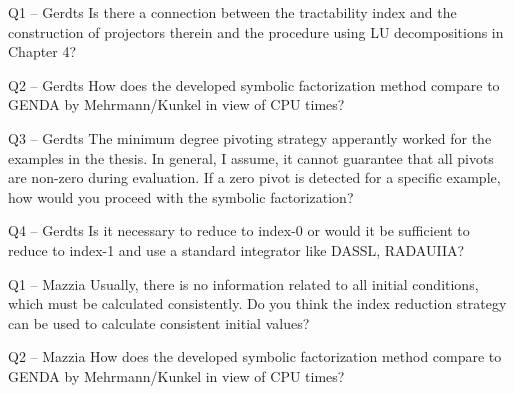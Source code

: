 
\begin{frame}{Q1 -- Gerdts}
  Is there a connection between the tractability index and the construction of projectors therein and the procedure using LU decompositions in Chapter 4?
\end{frame}

\begin{frame}{Q2 -- Gerdts}
  How does the developed symbolic factorization method compare to GENDA by Mehrmann/Kunkel in view of CPU times?
\end{frame}

\begin{frame}{Q3 -- Gerdts}
  The minimum degree pivoting strategy apperantly worked for the examples in the thesis. In general, I assume, it cannot guarantee that all pivots are non-zero during evaluation. If a zero pivot is detected for a specific example, how would you proceed with the symbolic factorization?
\end{frame}

\begin{frame}{Q4 -- Gerdts}
  Is it necessary to reduce to index-0 or would it be sufficient to reduce to index-1 and use a standard integrator like DASSL, RADAUIIA?
\end{frame}

\begin{frame}{Q1 -- Mazzia}
  Usually, there is no information related to all initial conditions, which must be calculated consistently. Do you think the index reduction strategy can be used to calculate consistent initial values?
\end{frame}

\begin{frame}{Q2 -- Mazzia}
  How does the developed symbolic factorization method compare to GENDA by Mehrmann/Kunkel in view of CPU times?
\end{frame}

